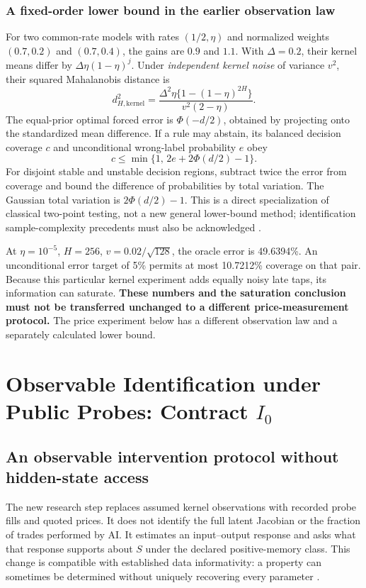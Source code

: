 \documentclass[10pt,twocolumn,letterpaper]{article}
\theoremstyle{definition}
\theoremstyle{remark}
\begin{document}
\subsubsection{A fixed-order lower bound in the earlier observation law}
For two common-rate models with rates $(1/2,\eta)$ and normalized weights $(0.7,0.2)$ and $(0.7,0.4)$, the gains are $0.9$ and $1.1$. With $\Delta=0.2$, their kernel means differ by $\Delta\eta(1-\eta)^j$. Under \emph{independent kernel noise} of variance $v^2$, their squared Mahalanobis distance is
\begin{equation}
 d_{H,\mathrm{kernel}}^2=
 \frac{\Delta^2\eta\{1-(1-\eta)^{2H}\}}{v^2(2-\eta)}.
 \label{eq:kernel_distance_retained}
\end{equation}
The equal-prior optimal forced error is $\Phi(-d/2)$, obtained by projecting onto the standardized mean difference. If a rule may abstain, its balanced decision coverage $c$ and unconditional wrong-label probability $e$ obey
\begin{equation}
 c\le \min\{1,\,2e+2\Phi(d/2)-1\}.
 \label{eq:retained_coverage_limit}
\end{equation}
For disjoint stable and unstable decision regions, subtract twice the error from coverage and bound the difference of probabilities by total variation. The Gaussian total variation is $2\Phi(d/2)-1$. This is a direct specialization of classical two-point testing, not a new general lower-bound method; identification sample-complexity precedents must also be acknowledged \citep{jedra2019}.

At $\eta=10^{-5}$, $H=256$, $v=0.02/\sqrt{128}$, the oracle error is 49.6394\%. An unconditional error target of 5\% permits at most 10.7212\% coverage on that pair. Because this particular kernel experiment adds equally noisy late taps, its information can saturate. \textbf{These numbers and the saturation conclusion must not be transferred unchanged to a different price-measurement protocol.} The price experiment below has a different observation law and a separately calculated lower bound.

\section{Observable Identification under Public Probes: Contract \texorpdfstring{$I_0$}{I0}}
\label{sec:ch4}

\subsection{An observable intervention protocol without hidden-state access}
\label{sec:observable_protocol}
The new research step replaces assumed kernel observations with recorded probe fills and quoted prices. It does not identify the full latent Jacobian or the fraction of trades performed by AI. It estimates an input--output response and asks what that response supports about $S$ under the declared positive-memory class. This change is compatible with established data informativity: a property can sometimes be determined without uniquely recovering every parameter \citep{vanwaarde2020}.
\end{document}
